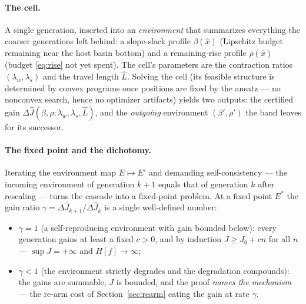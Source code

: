 \documentclass[11pt]{article}
\begin{document}
\paragraph{The cell.} A single generation, inserted into an
\emph{environment} that summarizes everything the coarser generations left
behind: a slope-slack profile $\beta(\hat x)$ (Lipschitz budget remaining
near the host basin bottom) and a remaining-rise profile $\rho(\hat x)$
(budget \eqref{eq:rise} not yet spent). The cell's parameters are the
contraction ratios $(\lambda_w,\lambda_s)$ and the travel length $\hat L$.
Solving the cell (its feasible structure is determined by convex
programs once positions are fixed by the ansatz --- no nonconvex search,
hence no optimizer artifacts) yields two outputs: the certified gain
$\Delta\hat J(\beta,\rho;\lambda_w,\lambda_s,\hat L)$, and the
\emph{outgoing} environment $(\beta',\rho')$ the band leaves for its
successor.

\paragraph{The fixed point and the dichotomy.} Iterating the environment
map $E\mapsto E'$ and demanding self-consistency --- the incoming
environment of generation $k{+}1$ equals that of generation $k$ after
rescaling --- turns the cascade into a fixed-point problem. At a fixed
point $E^\ast$ the gain ratio $\gamma=\Delta\hat J_{k+1}/\Delta\hat J_k$
is a single well-defined number:
\begin{itemize}
\item $\gamma=1$ (a self-reproducing environment with gain bounded below):
every generation gains at least a fixed $c>0$, and by induction
$J\ge J_0+cn$ for all $n$ --- $\sup J=+\infty$ and $H[f]\to\infty$;
\item $\gamma<1$ (the environment strictly degrades and the degradation
compounds): the gains are summable, $J$ is bounded, and the proof
\emph{names the mechanism} --- the re-arm cost of
Section~\ref{sec:rearm} eating the gain at rate $\gamma$.
\end{itemize}
\end{document}
